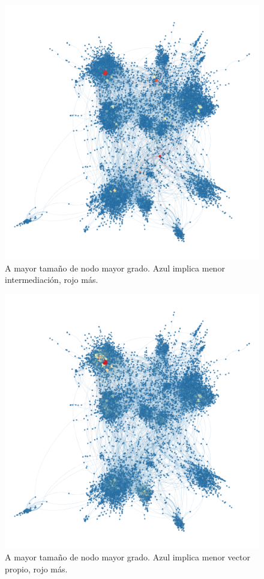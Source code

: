 \begin{figure}[ht]
    \centerfloat
    \includegraphics[width=1.3\textwidth]{img/resultados/grado-intermediacion.png}
    \caption{A mayor tamaño de nodo mayor grado. Azul implica menor intermediación, rojo más.}
\end{figure}

\begin{figure}[ht]
    \centerfloat
    \includegraphics[width=1.3\textwidth]{img/resultados/grado-vectorPropio.png}
    \caption{A mayor tamaño de nodo mayor grado. Azul implica menor vector propio, rojo más.}
\end{figure}

